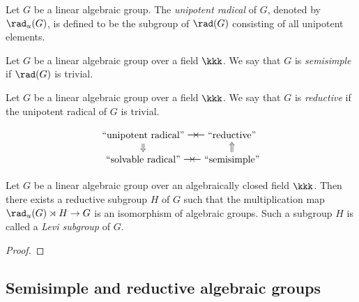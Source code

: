     \begin{definition}\label{def:nilradical_of_linear_algebraic_group}
        Let \(G\) be a linear algebraic group. 
        The \emph{unipotent radical} of \(G\), denoted by \(\rad_u(G)\), is defined to be the subgroup of \(\rad(G)\) consisting of all unipotent elements.
    \end{definition}

    \begin{definition}\label{def:semisimple_linear_algebraic_group}
        Let \(G\) be a linear algebraic group over a field \(\kkk\). 
        We say that \(G\) is \emph{semisimple} if \(\rad(G)\) is trivial.
    \end{definition}

    \begin{definition}\label{def:reductive_linear_algebraic_group}
        Let \(G\) be a linear algebraic group over a field \(\kkk\). 
        We say that \(G\) is \emph{reductive} if the unipotent radical of \(G\) is trivial.
    \end{definition}

    \begin{slogan}\label{slogan:structure_of_linear_algebraic_groups}
        \[ 
            \begin{tikzcd}[row sep=small,column sep=small]
                \text{``unipotent radical''} \arrow[r,phantom,"\rightarrow\!\leftarrow"] \arrow[d,Rightarrow]   & \text{``reductive''}  \\
                \text{``solvable radical''} \arrow[r,phantom,"\rightarrow\!\leftarrow"]                         & \text{``semisimple''} \arrow[u,Rightarrow]
            \end{tikzcd}
        \]
    \end{slogan}

    \begin{theorem}\label{thm:levi_decomposition}
        Let \(G\) be a linear algebraic group over an algebraically closed field \(\kkk\). 
        Then there exists a reductive subgroup \(H\) of \(G\) such that the multiplication map \(\rad_u(G) \rtimes H \to G\) is an isomorphism of algebraic groups.
        Such a subgroup \(H\) is called a \emph{Levi subgroup} of \(G\).
    \end{theorem}
    \begin{proof}
    \end{proof}



\subsection{Semisimple and reductive algebraic groups}


